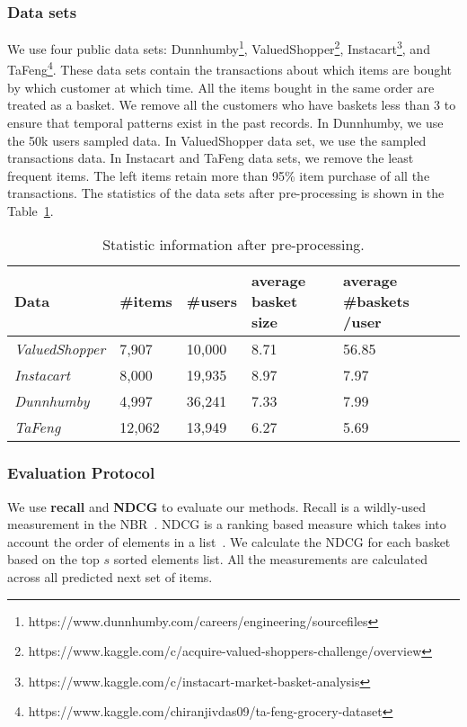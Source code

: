 \documentclass[sigconf]{acmart}
\begin{document}
\subsubsection{Data sets}
\label{sec:exp_data}
We use four public data sets: 
 Dunnhumby\footnote{https://www.dunnhumby.com/careers/engineering/sourcefiles}, ValuedShopper\footnote{https://www.kaggle.com/c/acquire-valued-shoppers-challenge/overview},  Instacart\footnote{https://www.kaggle.com/c/instacart-market-basket-analysis}, and TaFeng\footnote{https://www.kaggle.com/chiranjivdas09/ta-feng-grocery-dataset}. These data sets contain the  transactions about which items are bought by  which customer at which  time. All the items bought in the same order are treated as a basket.  We remove all the customers who have baskets  less than 3 to ensure that temporal  patterns exist in the past records. In Dunnhumby, we use the 50k users sampled data. In ValuedShopper data set, we use the sampled transactions data. In Instacart and TaFeng data sets, we remove the least frequent items. The left items retain more than 95\%  item purchase of all the transactions. The  statistics of the data sets after pre-processing is shown in the Table~\ref{tab:statistic}. 


\begin{table}[ht]
\small
\centering
\caption{Statistic information after pre-processing.}
\begin{tabularx}{\linewidth}{lXXXXX}
\toprule
Data &\#items &\#users &average basket size &average \#baskets /user\\
\midrule

\emph{ValuedShopper} &7,907  &10,000& 8.71& 56.85\\
\emph{Instacart} &8,000  &19,935 &8.97&7.97 \\
\emph{Dunnhumby} &4,997  &36,241 &7.33&7.99 \\
\emph{TaFeng}&12,062&13,949&6.27&5.69\\
\bottomrule
\end{tabularx}
\label{tab:statistic}
\end{table}




\subsubsection{Evaluation Protocol}

We use \textbf{recall} and \textbf{NDCG} to  evaluate our methods.
Recall is a wildly-used measurement in the  NBR~\cite{ying2018sequential}.
NDCG is a ranking based measure which takes into account the order of elements in a list~\cite{he2015trirank}. We calculate the NDCG for each basket  based on the top $s$ sorted  elements list. All the measurements are calculated across all predicted next set of items. 
\end{document}

